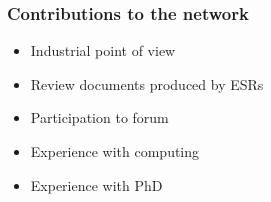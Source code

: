 \documentclass[14pt]{beamer}
\begin{document}
\begin{frame}
\frametitle{Contributions to the network}
\begin{itemize}
\item Industrial point of view
\item Review documents produced by ESRs
\item Participation to forum
\item Experience with computing
\item Experience with PhD
\end{itemize}
\end{frame}
\end{document}
